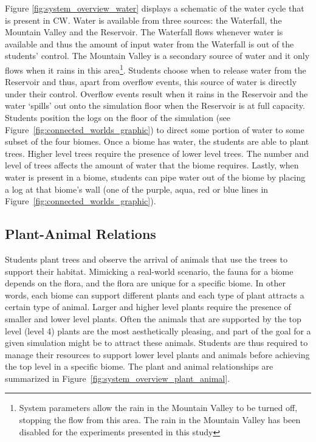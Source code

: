 Figure \ref{fig:system_overview_water} displays a schematic of the water cycle that is present in CW. Water is available from three sources: the Waterfall, the Mountain Valley and the Reservoir. The Waterfall flows whenever water is available and thus the amount of input water from the Waterfall is out of the students' control. The Mountain Valley is a secondary source of water and it only flows when it rains in this area\footnote{System parameters allow the rain in the Mountain Valley to be turned off, stopping the flow from this area. The rain in the Mountain Valley has been disabled for the experiments presented in this study}. Students choose when to release water from the Reservoir and thus, apart from overflow events, this source of water is directly under their control. Overflow events result when it rains in the Reservoir and the water `spills' out onto the simulation floor when the Reservoir is at full capacity. Students position the logs on the floor of the simulation (see Figure~\ref{fig:connected_worlds_graphic}) to direct some portion of water to some subset of the four biomes. Once a biome has water, the students are able to plant trees. Higher level trees require the presence of lower level trees. The number and level of trees affects the amount of water that the biome requires. Lastly, when water is present in a biome, students can pipe water out of the biome by placing a log at that biome's wall (one of the purple, aqua, red or blue lines in Figure~\ref{fig:connected_worlds_graphic}).



\subsection{Plant-Animal Relations}

Students plant trees and observe the arrival of animals that use the trees to support their habitat. Mimicking a real-world scenario, the fauna for a biome depends on the flora, and the flora are unique for a specific biome. In other words, each biome can support different plants and each type of plant attracts a certain type of animal. Larger and higher level plants require the presence of smaller and lower level plants. Often the animals that are supported by the top level (level 4) plants are the most aesthetically pleasing, and part of the goal for a given simulation might be to attract these animals. Students are thus required to manage their resources to support lower level plants and animals before achieving the top level in a specific biome. The plant and animal relationships are summarized in Figure~\ref{fig:system_overview_plant_animal}.


